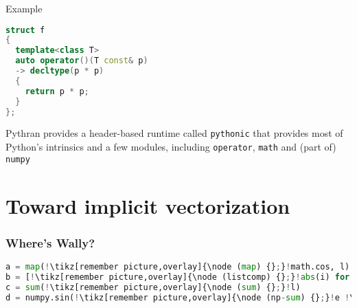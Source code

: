 \documentclass[serif]{beamer} %
\begin{document}
\begin{frame}[fragile]{Example}
\begin{lstlisting}[basicstyle=\scriptsize\ttfamily,language=c++,]
struct f
{
  template<class T>
  auto operator()(T const& p)
  -> decltype(p * p)
  {
    return p * p;
  }
};
\end{lstlisting}

\structure{\hrule}\hspace{1em}

Pythran provides a header-based runtime called \texttt{pythonic} that provides most of Python's intrinsics and a few modules, including \texttt{operator}, \texttt{math} and (part of) \texttt{numpy}
\end{frame}


\section{Toward implicit vectorization}

\begin{frame}[fragile]
    \frametitle{Where's Wally?}
    \centering
    \begin{lstlisting}[language=Python,escapechar=!]
a = map(!\tikz[remember picture,overlay]{\node (map) {};}!math.cos, l)
b = [!\tikz[remember picture,overlay]{\node (listcomp) {};}!abs(i) for i in l]
c = sum(!\tikz[remember picture,overlay]{\node (sum) {};}!l)
d = numpy.sin(!\tikz[remember picture,overlay]{\node (np-sum) {};}!e !\tikz[remember picture,overlay]{\node (np-add) [yshift=.2em] {\texttt{+}};}! 2 !\tikz[remember picture,overlay]{\node (np-mul) [yshift=.2em] {\texttt{*}};}! f)
\end{lstlisting}



\end{frame}
\end{document}
